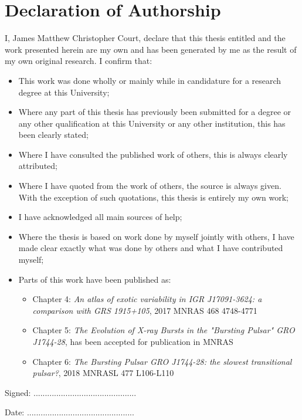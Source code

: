 \chapter*{Declaration of Authorship}




I, James Matthew Christopher Court, declare that this thesis entitled \textit{\thesistitle} and the work presented herein are my own and has been generated by me as the result of my own original research. I confirm that:

\begin{itemize}
	\item{This work was done wholly or mainly while in candidature for a research degree at this University;}
	\item{Where any part of this thesis has previously been submitted for a degree or any other qualification at this University or any other institution, this has been clearly stated;}
	\item{Where I have consulted the published work of others, this is always clearly attributed;}
	\item{Where I have quoted from the work of others, the source is always given. With the exception of such quotations, this thesis is entirely my own work;}
	\item{I have acknowledged all main sources of help;}
	\item{Where the thesis is based on work done by myself jointly with others, I have made clear exactly what was done by others and what I have contributed myself;}
	\item{Parts of this work have been published as:}
\begin{itemize}
		\item{Chapter 4: \textit{	
	An atlas of exotic variability in IGR J17091-3624: a comparison with GRS 1915+105}, 2017 MNRAS 468 4748-4771}
		\item{Chapter 5: \textit{The Evolution of X-ray Bursts in the "Bursting Pulsar" GRO J1744-28}, has been accepted for publication in MNRAS}
		\item{Chapter 6: \textit{The Bursting Pulsar GRO J1744-28: the slowest transitional pulsar?}, 2018 MNRASL 477 L106-L110}
\end{itemize}
\end{itemize}


Signed: .............................................

Date: ...............................................